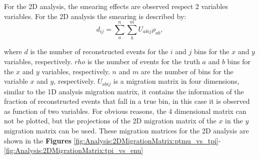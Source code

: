For the 2D analysis, the smearing effects are observed respect 2 variables variables. For the 2D analysis the smearing is described by:
\begin{equation}
    d_{ij}=\sum^{n}_{a}\sum^{m}_{b}U_{abij}\rho_{ab},
    \label{eq:Analysis:unfolding:SmearingEq2D}
\end{equation}

where $d$ is the number of reconstructed events for the $i$ and $j$ bins for the $x$ and $y$ variables, respectively. $rho$ is the number of events for the truth $a$ and $b$ bins for the $x$ and $y$ variables, respectively. $n$ and $m$ are the number of bins for the variable $x$ and $y$, respectively. $U_{abij}$ is a migration matrix in four dimensions, similar to the 1D analysis migration matrix, it contains the information of the fraction of reconstructed events that fall in a true bin, in this case it is observed as function of two variables. For obvious reasons, the 4 dimensional matrix can not be plotted, but the projections of the 2D migration matrix of the $x$ in the $y$ migration matrix can be used. These migration matrices for the 2D analysis are shown in the \textbf{Figures} \ref{fig:Analysis:2DMigrationMatrix:ptmu_vs_tpi}-\ref{fig:Analysis:2DMigrationMatrix:tpi_vs_enu}

